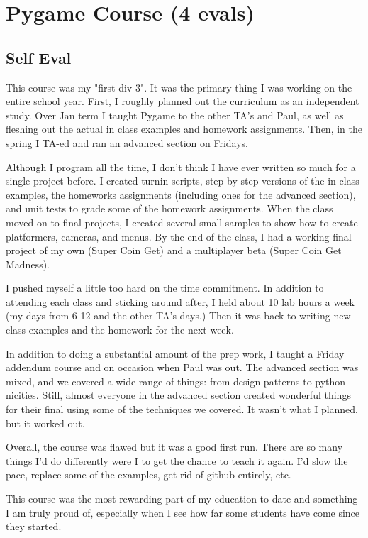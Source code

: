 \section{Pygame Course (4 evals)}

\begin{meta}
\end{meta}

\subsection*{Self Eval}
This course was my "first div 3". It was the primary thing I was working
on the entire school year. First, I roughly planned out the curriculum
as an independent study. Over Jan term I taught Pygame to the other
TA's and Paul, as well as fleshing out the actual in class examples and
homework assignments. Then, in the spring I TA-ed and ran an advanced
section on Fridays.

Although I program all the time, I don't think I have ever written
so much for a single project before. I created turnin scripts, step
by step versions of the in class examples, the homeworks assignments
(including ones for the advanced section), and unit tests to grade some
of the homework assignments. When the class moved on to final projects,
I created several small samples to show how to create platformers,
cameras, and menus. By the end of the class, I had a working final
project of my own (Super Coin Get) and a multiplayer beta (Super Coin
Get Madness).

I pushed myself a little too hard on the time commitment. In addition
to attending each class and sticking around after, I held about 10 lab
hours a week (my days from 6-12 and the other TA's days.) Then it was
back to writing new class examples and the homework for the next week.

In addition to doing a substantial amount of the prep work, I taught a
Friday addendum course and on occasion when Paul was out. The advanced
section was mixed, and we covered a wide range of things: from design
patterns to python nicities. Still, almost everyone in the advanced
section created wonderful things for their final using some of the
techniques we covered. It wasn't what I planned, but it worked out.

Overall, the course was flawed but it was a good first run. There are
so many things I'd do differently were I to get the chance to teach
it again. I'd slow the pace, replace some of the examples, get rid of
github entirely, etc.

This course was the most rewarding part of my education to date and
something I am truly proud of, especially when I see how far some
students have come since they started.

\vspace{1in}

